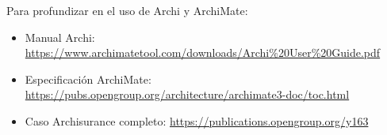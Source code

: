 Para profundizar en el uso de Archi y ArchiMate:

\begin{itemize}
\item Manual Archi: \url{https://www.archimatetool.com/downloads/Archi\%20User\%20Guide.pdf}
\item Especificación ArchiMate: \url{https://pubs.opengroup.org/architecture/archimate3-doc/toc.html}
\item Caso Archisurance completo: \url{https://publications.opengroup.org/y163}
\end{itemize}



